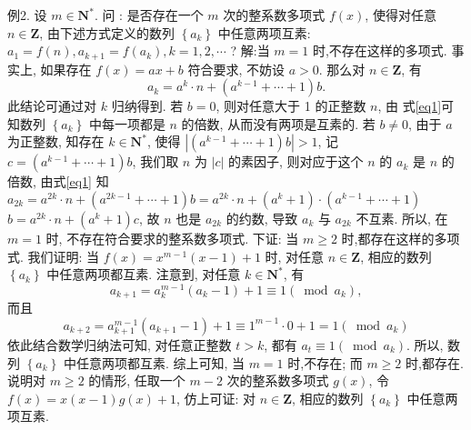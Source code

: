 例2. 设 $m \in \mathbf{N}^*$. 问 : 是否存在一个 $m$ 次的整系数多项式 $f(x)$, 使得对任意 $n \in \mathbf{Z}$, 由下述方式定义的数列 $\left\{a_k\right\}$ 中任意两项互素: $a_1=f(n), a_{k+1}= f\left(a_k\right), k=1,2, \cdots$ ?
解:当 $m=1$ 时,不存在这样的多项式.
事实上, 如果存在 $f(x)=a x+b$ 符合要求, 不妨设 $a>0$. 那么对 $n \in \mathbf{Z}$, 有
$$
a_k=a^k \cdot n+\left(a^{k-1}+\cdots+1\right) b . \label{eq1}
$$
此结论可通过对 $k$ 归纳得到.
若 $b=0$, 则对任意大于 1 的正整数 $n$, 由 式\ref{eq1}可知数列 $\left\{a_k\right\}$ 中每一项都是 $n$ 的倍数, 从而没有两项是互素的.
若 $b \neq 0$, 由于 $a$ 为正整数, 知存在 $k \in \mathbf{N}^*$, 使得 $\left|\left(a^{k-1}+\cdots+1\right) b\right|>1$, 记 $c=\left(a^{k-1}+\cdots+1\right) b$, 我们取 $n$ 为 $|c|$ 的素因子, 则对应于这个 $n$ 的 $a_k$ 是 $n$ 的倍数, 由式\ref{eq1} 知 $a_{2 k}=a^{2 k} \cdot n+\left(a^{2 k-1}+\cdots+1\right) b=a^{2 k} \cdot n+\left(a^k+1\right) \cdot\left(a^{k-1}+\cdots+1\right)$  $b=a^{2 k} \cdot n+\left(a^k+1\right) c$, 故 $n$ 也是 $a_{2 k}$ 的约数, 导致 $a_k$ 与 $a_{2 k}$ 不互素.
所以, 在 $m=1$ 时, 不存在符合要求的整系数多项式.
下证: 当 $m \geqslant 2$ 时,都存在这样的多项式.
我们证明: 当 $f(x)=x^{m-1}(x-1)+1$ 时, 对任意 $n \in \mathbf{Z}$, 相应的数列 $\left\{a_k\right\}$ 中任意两项都互素.
注意到, 对任意 $k \in \mathbf{N}^*$, 有
$$
a_{k+1}=a_k^{m-1}\left(a_k-1\right)+1 \equiv 1\left(\bmod a_k\right),
$$
而且
$$
a_{k+2}=a_{k+1}^{m-1}\left(a_{k+1}-1\right)+1 \equiv 1^{m-1} \cdot 0+1=1\left(\bmod a_k\right)
$$
依此结合数学归纳法可知, 对任意正整数 $t>k$, 都有 $a_t \equiv 1\left(\bmod a_k\right)$. 所以, 数列 $\left\{a_k\right\}$ 中任意两项都互素.
综上可知, 当 $m=1$ 时,不存在; 而 $m \geqslant 2$ 时,都存在.
说明对 $m \geqslant 2$ 的情形, 任取一个 $m-2$ 次的整系数多项式 $g(x)$, 令 $f(x)=x(x-1) g(x)+1$, 仿上可证: 对 $n \in \mathbf{Z}$, 相应的数列 $\left\{a_k\right\}$ 中任意两项互素.



